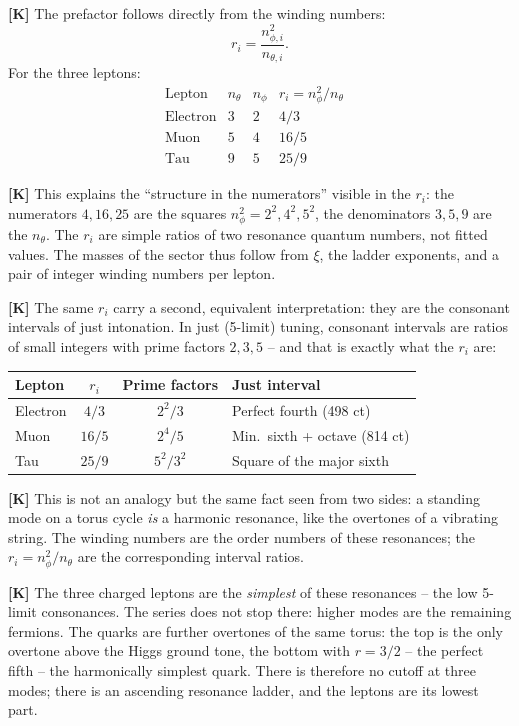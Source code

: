 \textbf{[K]} The prefactor follows directly from the winding numbers:
\[
  r_i = \frac{n_{\phi,i}^2}{n_{\theta,i}}.
\]
For the three leptons:
\[
  \begin{array}{lcccl}
    \text{Lepton} & n_\theta & n_\phi & r_i = n_\phi^2/n_\theta & \\[2pt]
    \text{Electron} & 3 & 2 & 4/3  & \\
    \text{Muon}     & 5 & 4 & 16/5 & \\
    \text{Tau}      & 9 & 5 & 25/9 &
  \end{array}
\]

\textbf{[K]} This explains the ``structure in the numerators'' visible in the $r_i$:
the numerators $4, 16, 25$ are the squares $n_\phi^2 = 2^2, 4^2, 5^2$,
the denominators $3, 5, 9$ are the $n_\theta$. The $r_i$ are simple
ratios of two resonance quantum numbers, not fitted values. The masses
of the sector thus follow from $\xi$, the ladder exponents, and a pair
of integer winding numbers per lepton.

\textbf{[K]} The same $r_i$ carry a second, equivalent interpretation: they are
the consonant intervals of just intonation. In just (5-limit) tuning,
consonant intervals are ratios of small integers with prime factors $2, 3, 5$
-- and that is exactly what the $r_i$ are:
\begin{center}
\begin{tabular}{lccl}
\hline
Lepton & $r_i$ & Prime factors & Just interval \\
\hline
Electron & $4/3$  & $2^2/3$   & Perfect fourth (498 ct) \\
Muon     & $16/5$ & $2^4/5$   & Min.\ sixth + octave (814 ct) \\
Tau      & $25/9$ & $5^2/3^2$ & Square of the major sixth \\
\hline
\end{tabular}
\end{center}

\textbf{[K]} This is not an analogy but the same fact seen from two sides:
a standing mode on a torus cycle \emph{is} a harmonic resonance,
like the overtones of a vibrating string. The winding numbers are
the order numbers of these resonances; the $r_i = n_\phi^2/n_\theta$ are the
corresponding interval ratios.

\textbf{[K]} The three charged leptons are the \emph{simplest} of these
resonances -- the low 5-limit consonances. The series does not stop there:
higher modes are the remaining fermions. The quarks are further overtones of the same torus:
the top is the only overtone above the Higgs ground tone, the bottom with $r=3/2$
-- the perfect fifth -- the harmonically simplest quark. There is therefore no
cutoff at three modes; there is an ascending resonance ladder, and the leptons
are its lowest part.

